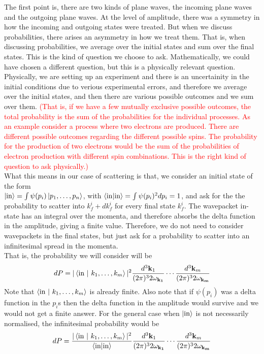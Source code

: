 \documentclass[11pt, notitlepage]{report}
\newcommand{\w}{\omega}
\numberwithin{equation}{section}
\begin{document}
    The first point is, there are two kinds of plane waves, the incoming plane waves and the outgoing plane waves. At the level of amplitude, there was a symmetry in how the incoming and outgoing states were treated. But when we discuss probabilities, there arises an asymmetry in how we treat them. That is, when discussing probabilities, we average over the initial states and sum over the final states. This is the kind of question we choose to ask. Mathematically, we could have chosen a different question, but this is a physically relevant question. Physically, we are setting up an experiment and there is an uncertainity in the initial conditions due to verious experimental errors, and therefore we average over the initial states, and then there are various possible outcomes and we sum over them. \textcolor{red}{(That is, if we have a few mutually exclusive possible outcomes, the total probability is the sum of the probabilities for the individual processes. As an example consider a process where two electrons are produced. There are different possible outcomes regarding the different possible spins. The probability for the production of two electrons would be the sum of the probabilities of electron production with different spin combinations. This is the right kind of question to ask physically.)}\\

    What this means in our case of scattering is that, we consider an initial state of the form \\
    \(\ket{\text{in}} = \int \psi(p_i) \ket{p_1, \ldots, p_n}\), with \(\braket{\text{in}|\text{in}} = \int \psi(p_i)^2 dp_i = 1\), and ask for the the probability to scatter into \(k_f^i + dk_f^i\) for every final state \(k_f^i\). The wavepacket in-state has an integral over the momenta, and therefore absorbs the delta function in the amplitude, giving a finite value. Therefore, we do not need to consider wavepackets in the final states, but just ask for a probability to scatter into an infinitesimal spread in the momenta. \\ 
    That is, the probability we will consider will be 
    \begin{equation*}
        dP = |\braket{\text{in}~| ~k_1, \ldots, k_m}|^2 \frac{d^3\textbf{k}_1}{(2\pi)^3 2\w_\mathbf{k_1}}\cdots \frac{d^3\textbf{k}_m}{(2\pi)^3 2\w_\mathbf{k_m}}
    \end{equation*}
    Note that \(\braket{\text{in}~| ~k_1, \ldots, k_m}\) is already finite. Also note that if \(\psi(p_i)\) was a delta function in the \(p_i\)s then the delta function in the amplitude would survive and we would not get a finite answer. For the general case when \(\ket{\text{in}}\) is not necessarily normalised, the infinitesimal probability would be 
    \begin{equation*}
        dP = \frac{|\braket{\text{in}~| ~k_1, \ldots, k_m}|^2}{\braket{\text{in}|\text{in}}}\frac{d^3\textbf{k}_1}{(2\pi)^3 2\w_\mathbf{k_1}}\cdots \frac{d^3\textbf{k}_m}{(2\pi)^3 2\w_\mathbf{k_m}}
    \end{equation*}
    
\end{document}
